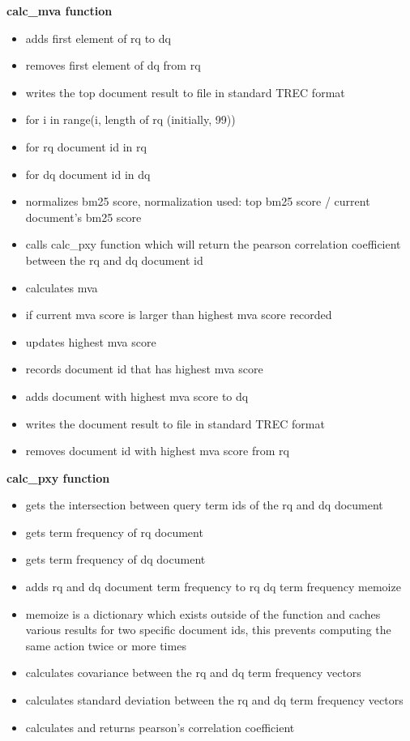 \documentclass{article} %
\begin{document}
\textbf{calc\_mva function}

\begin{itemize}
    \item adds first element of rq to dq
    \item removes first element of dq from rq
    \item writes the top document result to file in standard TREC format
    \item for i in range(i, length of rq (initially, 99))
    \item for rq document id in rq
    \item for dq document id in dq
    \item normalizes bm25 score, normalization used: top bm25 score / current document's bm25 score
    \item calls calc\_pxy function which will return the pearson correlation coefficient between the rq and dq document id
    \item calculates mva
    \item if current mva score is larger than highest mva score recorded
    \item updates highest mva score
    \item records document id that has highest mva score
    \item adds document with highest mva score to dq
    \item writes the document result to file in standard TREC format
    \item removes document id with highest mva score from rq
\end{itemize}

\textbf{calc\_pxy function}

\begin{itemize}
    \item gets the intersection between query term ids of the rq and dq document
    \item gets term frequency of rq document
    \item gets term frequency of dq document
    \item adds rq and dq document term frequency to rq dq term frequency memoize
    \item memoize is a dictionary which exists outside of the function and caches various results for two specific document ids, this prevents computing the same action twice or more times
    \item calculates covariance between the rq and dq term frequency vectors
    \item calculates standard deviation between the rq and dq term frequency vectors
    \item calculates and returns pearson's correlation coefficient
\end{itemize}
\end{document}
